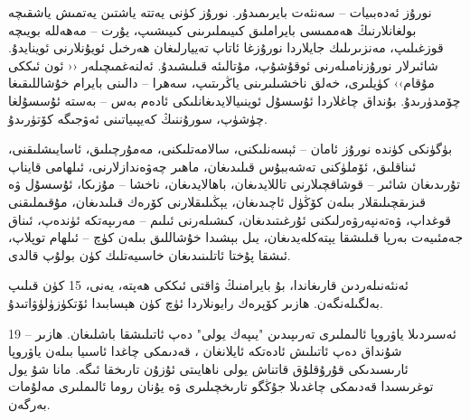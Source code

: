\documentclass[a4paper]{article}
\begin{document}
نورۇز ئەدەبىيات – سەنئەت بايرىمىدۇر. نورۇز كۈنى يەتتە ياشتىن يەتمىش ياشقىچە بولغانلارنىڭ ھەممىسى بايراملىق كىيىملىرىنى كىيىشىپ، يۇرت – مەھەللە بويىچە قوزغىلىپ، مەنزىرىلىك جايلاردا نورۇزغا ئاتاپ تەييارلىغان ھەرخىل ئويۇنلارنى ئوينايدۇ. شائىرلار نورۇزنامىلەرنى ئوقۇشۇپ، مۇتالىئە قىلىشىدۇ. ئەلنەغمىچىلەر ‹‹ ئون ئىككى مۇقام›› كۈيلىرى، خەلق ناخشىلىرىنى ياڭرىتىپ، سەھرا – دالىنى بايرام خۇشاللىقىغا چۆمدۈرىدۇ. بۇنداق چاغلاردا ئۇسسۇل ئوينىيالايدىغانلىكى ئادەم بەس – بەستە ئۇسسۇلغا چۈشۈپ، سورۇننىڭ كەيپىياتىنى ئەۋجىگە كۆتۈرىدۇ.



بۈگۈنكى كۈندە نورۇز ئامان – ئېسەنلىكنى، سالامەتلىكنى، مەمۇرچىلىق، ئاسايىشلىقنى، ئىناقلىق، ئۆملۈكنى تەشەببۇس قىلىدىغان، ماھىر چەۋەندازلارنى، ئىلھامى قايناپ تۇرىدىغان شائىر – قوشاقچىلارنى تاللايدىغان، باھالايدىغان، ناخشا – مۇزىكا، ئۇسسۇل ۋە قىزىقچىلىقلار بىلەن كۆڭۈل ئاچىدىغان، يېڭىلىقلارنى كۆرەك قىلىدىغان، مۇقىملىقنى قوغداپ، ۋەتەنپەرۋەرلىكنى ئۇرغىتىدىغان، كىشىلەرنى ئىلىم – مەرىپەتكە ئۈندەپ، ئىناق جەمئىيەت بەرپا قىلىشقا يېتەكلەيدىغان، يىل بېشىدا خۇشاللىق بىلەن كۈچ – ئىلھام توپلاپ، ئىشقا پۇختا ئاتلىنىدىغان خاسىيەتلىك كۈن بولۇپ قالدى.



ئەنئەنىلەردىن قارىغاندا، بۇ بايرامنىڭ ۋاقتى ئىككى ھەپتە، يەنى، 15 كۈن قىلىپ بەلگىلەنگەن. ھازىر كۆپرەك رايونلاردا ئۈچ كۈن ھېسابىدا ئۆتكۈزۈلۈۋاتىدۇ.

19 – ئەسىردىلا ياۋروپا ئالىملىرى تەرىپىدىن "يىپەك يولى" دەپ ئاتىلىشقا باشلىغان. ھازىر شۇنداق دەپ ئاتىلىش ئادەتكە ئايلانغان ، قەدىمكى چاغدا ئاسىيا بىلەن ياۋروپا ئارىسىدىكى قۇرۇقلۇق قاتناش يولى ناھايىتى ئۇزۇن تارىخقا ئىگە. مانا شۇ يول توغرىسىدا قەدىمكى چاغدىلا جۇڭگو تارىخچىلىرى ۋە يۇنان روما ئالىملىرى مەلۇمات بەرگەن.
\end{document}
